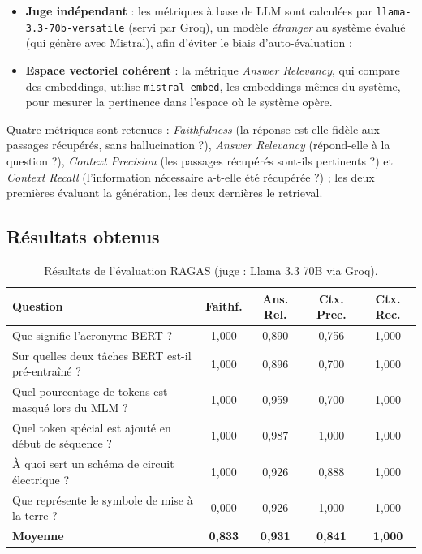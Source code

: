 \begin{itemize}
  \item \textbf{Juge indépendant} : les métriques à base de LLM sont calculées par
        \texttt{llama-3.3-70b-versatile} (servi par Groq), un modèle \emph{étranger} au
        système évalué (qui génère avec Mistral), afin d'éviter le biais
        d'auto-évaluation ;
  \item \textbf{Espace vectoriel cohérent} : la métrique \emph{Answer Relevancy}, qui
        compare des embeddings, utilise \texttt{mistral-embed}, les embeddings mêmes du
        système, pour mesurer la pertinence dans l'espace où le système opère.
\end{itemize}

Quatre métriques sont retenues : \emph{Faithfulness} (la réponse est-elle fidèle aux
passages récupérés, sans hallucination ?), \emph{Answer Relevancy} (répond-elle à la
question ?), \emph{Context Precision} (les passages récupérés sont-ils pertinents ?) et
\emph{Context Recall} (l'information nécessaire a-t-elle été récupérée ?) ; les deux
premières évaluant la génération, les deux dernières le retrieval.

\subsection{Résultats obtenus}

\begin{table}[!htb]
\centering\small
\caption{Résultats de l'évaluation RAGAS (juge : Llama 3.3 70B via Groq).}
\label{tab:ragas}
\begin{tabularx}{\textwidth}{@{}Xcccc@{}}
\toprule
\textbf{Question} & \textbf{Faithf.} & \textbf{Ans. Rel.} & \textbf{Ctx. Prec.} & \textbf{Ctx. Rec.} \\
\midrule
Que signifie l'acronyme BERT ? & 1{,}000 & 0{,}890 & 0{,}756 & 1{,}000 \\
Sur quelles deux tâches BERT est-il pré-entraîné ? & 1{,}000 & 0{,}896 & 0{,}700 & 1{,}000 \\
Quel pourcentage de tokens est masqué lors du MLM ? & 1{,}000 & 0{,}959 & 0{,}700 & 1{,}000 \\
Quel token spécial est ajouté en début de séquence ? & 1{,}000 & 0{,}987 & 1{,}000 & 1{,}000 \\
À quoi sert un schéma de circuit électrique ? & 1{,}000 & 0{,}926 & 0{,}888 & 1{,}000 \\
Que représente le symbole de mise à la terre ? & 0{,}000 & 0{,}926 & 1{,}000 & 1{,}000 \\
\midrule
\textbf{Moyenne} & \textbf{0{,}833} & \textbf{0{,}931} & \textbf{0{,}841} & \textbf{1{,}000} \\
\bottomrule
\end{tabularx}
\end{table}


